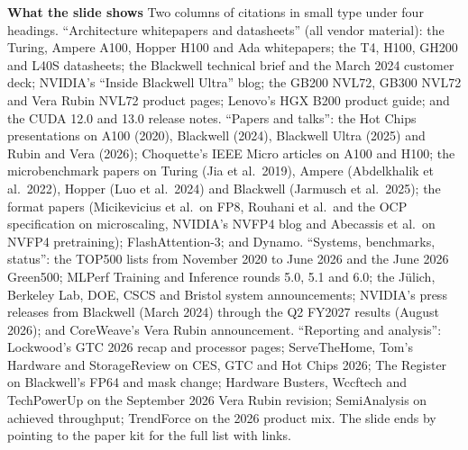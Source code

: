 \documentclass[11pt,letterpaper]{article}
\newcommand{\para}[1]{\medskip\noindent\textbf{#1}\quad}
\begin{document}
\para{What the slide shows} Two columns of citations in small type under four headings. ``Architecture whitepapers and datasheets'' (all vendor material): the Turing, Ampere A100, Hopper H100 and Ada whitepapers; the T4, H100, GH200 and L40S datasheets; the Blackwell technical brief and the March 2024 customer deck; NVIDIA's ``Inside Blackwell Ultra'' blog; the GB200 NVL72, GB300 NVL72 and Vera Rubin NVL72 product pages; Lenovo's HGX B200 product guide; and the CUDA 12.0 and 13.0 release notes. ``Papers and talks'': the Hot Chips presentations on A100 (2020), Blackwell (2024), Blackwell Ultra (2025) and Rubin and Vera (2026); Choquette's IEEE Micro articles on A100 and H100; the microbenchmark papers on Turing (Jia et al.\ 2019), Ampere (Abdelkhalik et al.\ 2022), Hopper (Luo et al.\ 2024) and Blackwell (Jarmusch et al.\ 2025); the format papers (Micikevicius et al.\ on FP8, Rouhani et al.\ and the OCP specification on microscaling, NVIDIA's NVFP4 blog and Abecassis et al.\ on NVFP4 pretraining); FlashAttention-3; and Dynamo. ``Systems, benchmarks, status'': the TOP500 lists from November 2020 to June 2026 and the June 2026 Green500; MLPerf Training and Inference rounds 5.0, 5.1 and 6.0; the J\"ulich, Berkeley Lab, DOE, CSCS and Bristol system announcements; NVIDIA's press releases from Blackwell (March 2024) through the Q2 FY2027 results (August 2026); and CoreWeave's Vera Rubin announcement. ``Reporting and analysis'': Lockwood's GTC 2026 recap and processor pages; ServeTheHome, Tom's Hardware and StorageReview on CES, GTC and Hot Chips 2026; The Register on Blackwell's FP64 and mask change; Hardware Busters, Wccftech and TechPowerUp on the September 2026 Vera Rubin revision; SemiAnalysis on achieved throughput; TrendForce on the 2026 product mix. The slide ends by pointing to the paper kit for the full list with links.
\end{document}
